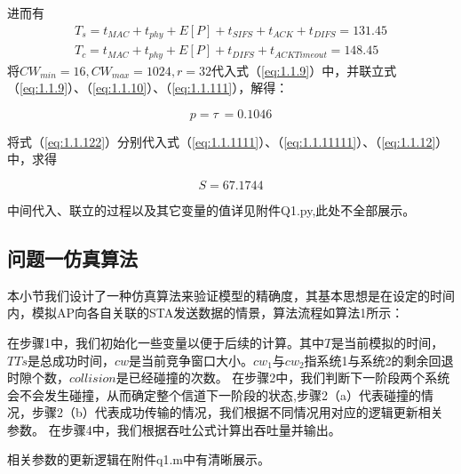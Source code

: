 \documentclass[bwprint]{gmcmthesis}
\begin{document}
进而有
\begin{equation}
\begin{array}{l}
    T_s = t_{MAC}+t_{phy}+E[P]+t_{SIFS}+t_{ACK}+t_{DIFS} = 131.45 \\
    T_c = t_{MAC}+t_{phy}+E[P]+t_{DIFS}+t_{ACKTimeout} = 148.45
\end{array}
\label{eq:1.1.122}
\end{equation}
将$CW_{min}=16,CW_{max}=1024,r=32$代入式（\ref{eq:1.1.9}）中，并联立式（\ref{eq:1.1.9}）、（\ref{eq:1.1.10}）、（\ref{eq:1.1.111}），解得：

\begin{equation}
    p= \tau \ = 0.1046 
    \label{eq:19}
\end{equation}

将式（\ref{eq:1.1.122}）分别代入式（\ref{eq:1.1.1111}）、（\ref{eq:1.1.11111}）、（\ref{eq:1.1.12}）中，求得

\begin{equation}
    S = 67.1744
\end{equation}

中间代入、联立的过程以及其它变量的值详见附件Q1.py,此处不全部展示。

\subsection{问题一仿真算法}

本小节我们设计了一种仿真算法来验证模型的精确度，其基本思想是在设定的时间内，模拟AP向各自关联的STA发送数据的情景，算法流程如算法1所示：

在步骤1中，我们初始化一些变量以便于后续的计算。其中$T$是当前模拟的时间，$TTs$是总成功时间，$cw$是当前竞争窗口大小。$cw_1$与$cw_2$指系统1与系统2的剩余回退时隙个数，$collision$是已经碰撞的次数。
在步骤2中，我们判断下一阶段两个系统会不会发生碰撞，从而确定整个信道下一阶段的状态,步骤2（a）代表碰撞的情况，步骤2（b）代表成功传输的情况，我们根据不同情况用对应的逻辑更新相关参数。
在步骤4中，我们根据吞吐公式计算出吞吐量并输出。

相关参数的更新逻辑在附件q1.m中有清晰展示。
\end{document}

